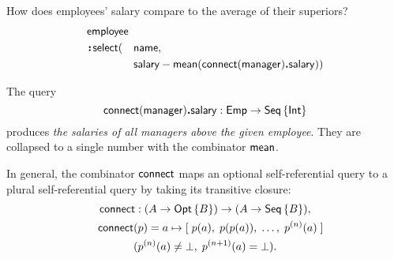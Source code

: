 \begin{example}
    \label{ex:employee-salary-vs-superior}
    How does employees' salary compare to the average of their superiors?
    \begin{alignat*}{2}
        & \Employee\hidewidth && \\
        & \Apply\Select(&& \Name, \\
        & && \Salary-\Mean(\Connect(\Manager)\To\Salary))
    \end{alignat*}
\end{example}

The query
\begin{equation*}
    \textup{\textsf{connect}}(\textup{\textsf{manager}})\boldsymbol{.}\textup{\textsf{salary}} : \textup{\textsf{Emp}} \to \textup{\textsf{Seq}}\left\{\textup{\textsf{Int}}\right\}
\end{equation*}
produces \emph{the salaries of all managers above the given employee}.  They
are collapsed to a single number with the combinator $\textup{\textsf{mean}}$.

In general, the combinator $\textup{\textsf{connect}}$ maps an optional self-referential query to a
plural self-referential query by taking its transitive closure:
\begin{multline*}
    \Connect : (A \to \Opt{B}) \to (A \to \Seq{B}), \\
    \shoveleft{\Connect(p) = a \mapsto [\;p(a),\; p(p(a)),\; \ldots,\; p^{(n)}(a)\;]} \\
    (p^{(n)}(a) \ne \bot,\; p^{(n+1)}(a) = \bot).
\end{multline*}

